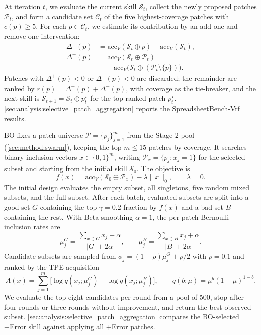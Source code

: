 At iteration $t$, we evaluate the current skill $\mathcal{S}_t$, collect the newly proposed patches $\mathcal{P}_t$, and form a candidate set $\mathcal{C}_t$ of the five highest-coverage patches with $c(p)\ge5$.
For each $p\in\mathcal{C}_t$, we estimate its contribution by an add-one and remove-one intervention:
\[
\begin{aligned}
\Delta^+(p)&=\mathrm{acc}_V(\mathcal{S}_t\oplus p)-\mathrm{acc}_V(\mathcal{S}_t),\\
\Delta^-(p)&=\mathrm{acc}_V(\mathcal{S}_t\oplus\mathcal{P}_t)\\
&\quad -\mathrm{acc}_V\!\bigl(\mathcal{S}_t\oplus(\mathcal{P}_t\setminus\{p\})\bigr).
\end{aligned}
\]
Patches with $\Delta^+(p)<0$ or $\Delta^-(p)<0$ are discarded; the remainder are ranked by $r(p)=\Delta^+(p)+\Delta^-(p)$, with coverage as the tie-breaker, and the next skill is $\mathcal{S}_{t+1}=\mathcal{S}_t\oplus p_t^\star$ for the top-ranked patch $p_t^\star$.
\cref{sec:analysis:selective_patch_aggregation} reports the SpreadsheetBench-Vrf results.

BO fixes a patch universe $\mathcal{P}=\{p_j\}_{j=1}^m$ from the Stage-2 pool (\cref{sec:method:swarm}), keeping the top $m\le15$ patches by coverage.
It searches binary inclusion vectors $x\in\{0,1\}^m$, writing $\mathcal{P}_x=\{p_j:x_j=1\}$ for the selected subset and starting from the initial skill $\mathcal{S}_0$.
The objective is
\[
f(x)=\mathrm{acc}_V(\mathcal{S}_0\oplus\mathcal{P}_x)-\lambda\|x\|_0,
\qquad \lambda=0.
\]
The initial design evaluates the empty subset, all singletons, five random mixed subsets, and the full subset.
After each batch, evaluated subsets are split into a good set $G$ containing the top $\gamma=0.2$ fraction by $f(x)$ and a bad set $B$ containing the rest.
With Beta smoothing $\alpha=1$, the per-patch Bernoulli inclusion rates are
\[
\mu^G_j=\frac{\sum_{x\in G}x_j+\alpha}{|G|+2\alpha},\qquad
\mu^B_j=\frac{\sum_{x\in B}x_j+\alpha}{|B|+2\alpha}.
\]
Candidate subsets are sampled from $\phi_j=(1-\rho)\mu^G_j+\rho/2$ with $\rho=0.1$ and ranked by the TPE acquisition
\[
A(x)=\sum_{j=1}^{m}\bigl[\log q(x_j;\mu^G_j)-\log q(x_j;\mu^B_j)\bigr],
\qquad q(b;\mu)=\mu^b(1-\mu)^{1-b}.
\]
We evaluate the top eight candidates per round from a pool of 500, stop after four rounds or three rounds without improvement, and return the best observed subset.
\cref{sec:analysis:selective_patch_aggregation} compares the BO-selected +Error skill against applying all +Error patches.

